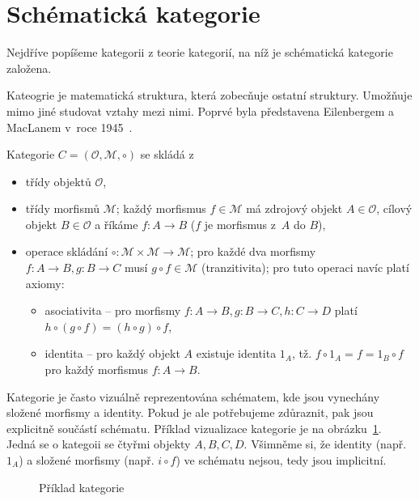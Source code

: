 \section{Schématická kategorie}

Nejdříve popíšeme kategorii z teorie kategorií, na níž je schématická kategorie založena.

Kateogrie je matematická struktura, která zobecňuje ostatní struktury.
Umožňuje mimo jiné studovat vztahy mezi nimi.
Poprvé byla představena Eilenbergem a MacLanem v~roce 1945~\cite{eilenberg_1945}.

Kategorie $C=(\mathcal O, \mathcal M, \circ)$ se skládá
z~\begin{itemize}
  \item třídy objektů $\mathcal O$,
  \item třídy morfismů $\mathcal M$; každý morfismus $f \in \mathcal M$ má zdrojový objekt $A\in\mathcal O$, cílový objekt $B\in\mathcal O$ a říkáme $f: A\to B$ ($f$ je morfismus z~$A$ do $B$),
  \item operace skládání $\circ\colon \mathcal M\times\mathcal M \to \mathcal M$; pro každé dva morfismy $f\colon A\to B, g\colon B\to C$ musí $g\circ f\in \mathcal M$ (tranzitivita); pro tuto operaci navíc platí axiomy:
        \begin{itemize}
          \item asociativita -- pro morfismy $f\colon A\to B, g\colon B\to C, h\colon C\to D$ platí $h\circ (g \circ f) = (h\circ g)\circ f$,
          \item identita -- pro každý objekt $A$ existuje identita $1_A$, tž. $f\circ 1_A = f = 1_B\circ f$ pro každý morfismus $f: A\to B$.
        \end{itemize}
\end{itemize}

Kategorie je často vizuálně reprezentována schématem, kde jsou vynechány složené morfismy a identity.
Pokud je ale potřebujeme zdůraznit, pak jsou explicitně součástí schématu.
Příklad vizualizace kategorie je na obrázku~\ref{fig:category-example}.
Jedná se o kategoii se čtyřmi objekty $A, B, C, D$.
Všimněme si, že identity (např. $1_A$) a složené morfismy (např. $i\circ f$) ve schématu nejsou, tedy jsou implicitní.

\begin{figure}[!htb]
  \begin{center}
  \end{center}
  \caption{Příklad kategorie}
  \label{fig:category-example}
\end{figure}

